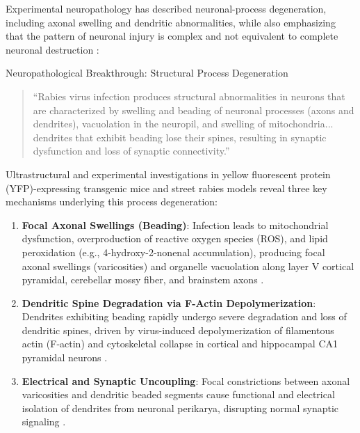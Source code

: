 \documentclass[12pt,a4paper]{article}
\begin{document}
Experimental neuropathology has described neuronal-process degeneration, including axonal swelling and dendritic abnormalities, while also emphasizing that the pattern of neuronal injury is complex and not equivalent to complete neuronal destruction \citep{scott2008rabies, jackson2013pathogenesis, jackson2025book} \citep{scott2008rabies, jackson2013pathogenesis, jackson2020, jackson2025book}:

\begin{clinicalpearl}{Neuropathological Breakthrough: Structural Process Degeneration}
\begin{quote}
``Rabies virus infection produces structural abnormalities in neurons that are characterized by swelling and beading of neuronal processes (axons and dendrites), vacuolation in the neuropil, and swelling of mitochondria... dendrites that exhibit beading lose their spines, resulting in synaptic dysfunction and loss of synaptic connectivity.'' \citep{scott2008rabies, jackson2013pathogenesis, jackson2025book}
\end{quote}
\end{clinicalpearl}

Ultrastructural and experimental investigations in yellow fluorescent protein (YFP)-expressing transgenic mice and street rabies models reveal three key mechanisms underlying this process degeneration:
\begin{enumerate}
    \item \textbf{Focal Axonal Swellings (Beading)}: Infection leads to mitochondrial dysfunction, overproduction of reactive oxygen species (ROS), and lipid peroxidation (e.g., 4-hydroxy-2-nonenal accumulation), producing focal axonal swellings (varicosities) and organelle vacuolation along layer V cortical pyramidal, cerebellar mossy fiber, and brainstem axons \citep{scott2008rabies, jackson2013pathogenesis, jackson2025book}.
    \item \textbf{Dendritic Spine Degradation via F-Actin Depolymerization}: Dendrites exhibiting beading rapidly undergo severe degradation and loss of dendritic spines, driven by virus-induced depolymerization of filamentous actin (F-actin) and cytoskeletal collapse in cortical and hippocampal CA1 pyramidal neurons \citep{scott2008rabies, song2013rabies}.
    \item \textbf{Electrical and Synaptic Uncoupling}: Focal constrictions between axonal varicosities and dendritic beaded segments cause functional and electrical isolation of dendrites from neuronal perikarya, disrupting normal synaptic signaling \citep{scott2008rabies}.
\end{enumerate}
\end{document}
